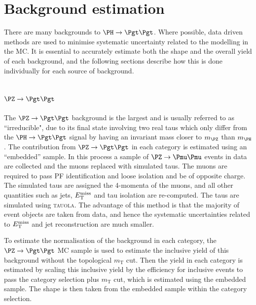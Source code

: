 \section{Background estimation}
\label{sec:backgrounds}

There are many backgrounds to $\HToTauTau$. Where possible, data driven methods
are used to minimise systematic uncertainty related to the modelling in the
\ac{MC}. It is essential to accurately estimate both the shape and the overall
yield of each background, and the following sections describe how this is done
individually for each source of background.

\subsection{$\PZ \to\Pgt\Pgt$}
\label{sec:backgroundEstimation_Ztautau}

The $\PZ \to \Pgt\Pgt$ background is the largest and is usually referred to as ``irreducible", due to its final
state involving two real taus which only differ from the $\PH \to \Pgt\Pgt$ signal by
having an invariant mass closer to $m_{\PZ}$ than $m_{\PH}$.
The contribution from $\ZToTauTau$ in each category is estimated using an
``embedded'' sample. In this process a sample of $\PZ\to\Pmu\Pmu$ events in data are
collected and the muons replaced with simulated taus. The muons are required
to pass \ac{PF} identification and loose isolation and be of opposite charge.
The simulated taus are assigned the 4-momenta of the muons, and all other
quantities such as jets, $E_{\mathrm{T}}^{\text{miss}}$ and tau isolation are re-computed. The taus
are simulated using \textsc{tauola}. 
The advantage of this method is that the majority of event objects
are taken from data, and hence the systematic uncertainties related to $E_{\mathrm{T}}^{\text{miss}}$
and jet reconstruction are much smaller. 

To estimate the normalisation of the background in each category, 
the $\ZToTauTau$ \ac{MC} sample is used to estimate 
the inclusive yield of this background without the topological $m_{\text{T}}$
cut. Then the yield in each category is estimated by scaling this inclusive yield by the efficiency for 
inclusive events to pass the category selection plus $m_{\text{T}}$ cut, which is estimated using the
embedded sample. The shape is then taken from the embedded sample within the
category selection.


